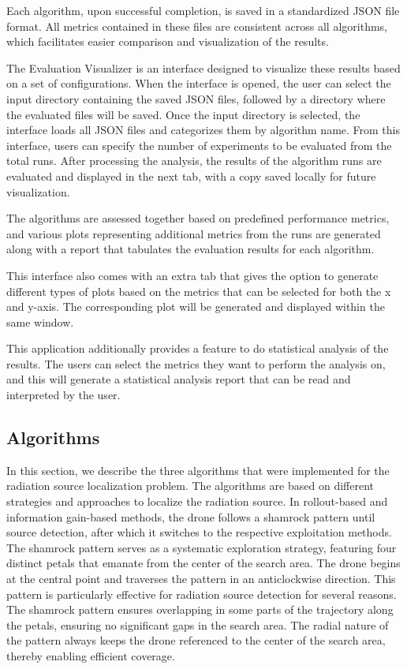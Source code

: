 \documentclass[../report.tex]{subfiles}
\begin{document}
    Each algorithm, upon successful completion, is saved in a standardized JSON file format. All metrics contained in these files are consistent across all algorithms, which facilitates easier 
    comparison and visualization of the results.

    The Evaluation Visualizer is an interface designed to visualize these results based on a set of configurations. When the interface is opened, the user can select the input directory containing 
    the saved JSON files, followed by a directory where the evaluated files will be saved. Once the input directory is selected, the interface loads all JSON files and categorizes them by algorithm
    name. From this interface, users can specify the number of experiments to be evaluated from the total runs. After processing the analysis, the results of the algorithm runs are evaluated and 
    displayed in the next tab, with a copy saved locally for future visualization.

    The algorithms are assessed together based on predefined performance metrics, and various plots representing additional metrics from the runs are generated along with a report that tabulates 
    the evaluation results for each algorithm. 

    This interface also comes with an extra tab that gives the option to generate different types of plots based on the metrics that can be selected for both the x and y-axis. The corresponding 
    plot will be generated and displayed within the same window.

    This application additionally provides a feature to do statistical analysis of the results. The users can select the metrics they want to perform the analysis on, and this will generate a 
    statistical analysis report that can be read and interpreted by the user.

    \subsection{Algorithms}

    In this section, we describe the three algorithms that were implemented for the radiation source localization problem. The algorithms are based on different strategies and approaches to
    localize the radiation source. In rollout-based and information gain-based methods, the drone follows a shamrock pattern until source detection, after which it switches to the 
    respective exploitation methods. The shamrock pattern serves as a systematic exploration strategy, featuring four distinct petals that emanate from the center of the search area. 
    The drone begins at the central point and traverses the pattern in an anticlockwise direction. This pattern is particularly effective for radiation source detection for several reasons.
    The shamrock pattern ensures overlapping in some parts of the trajectory along the petals, ensuring no significant gaps in the search area. The radial nature of the pattern always 
    keeps the drone referenced to the center of the search area, thereby enabling efficient coverage.
\end{document}
